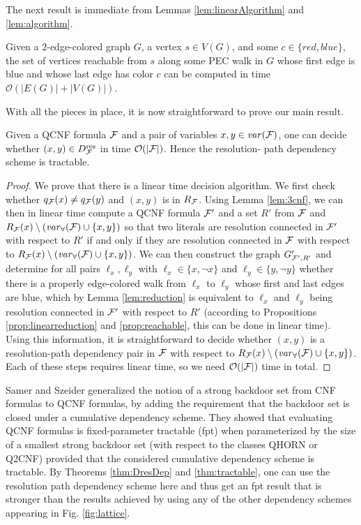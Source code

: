 \documentclass{llncs}
\newcommand{\Dres}{D^{\text{\normalfont res}}}
\def\hy{\hbox{-}\nobreak\hskip0pt} \newcommand{\ellipsis}{$\dots$}
\newcommand{\Card}[1]{|#1|}
\begin{document}
The next result is immediate from Lemmas \ref{lem:linearAlgorithm} and
\ref{lem:algorithm}.
\begin{proposition}\label{prop:reachable}
  Given a $2$\hy edge\hy colored graph $G$, a vertex $s \in V(G)$, and some $c
  \in \{ \mathit{red}, \mathit{blue} \}$, the set of vertices reachable from
  $s$ along some PEC walk in $G$ whose first edge is blue and whose last edge
  has color $c$ can be computed in time
  $\mathcal{O}(\Card{E(G)}+\Card{V(G)})$.
\end{proposition}
With all the pieces in place, it is now straightforward to prove our main result.
\begin{theorem} \label{thm:tractable} Given a QCNF formula $\mathcal{F}$ and a pair
  of variables $x, y \in \mathit{var}(\mathcal{F})$, one can decide whether $(x,y) \in
  \Dres_{\FFF}$ in time $\mathcal{O}(\Card{\FFF})$. Hence the resolution\hy
  path dependency scheme is tractable.
\end{theorem}
\begin{proof}
  We prove that there is a linear time decision algorithm. We first check
  whether $q_{\mathcal{F}}(x) \neq q_{\mathcal{F}}(y)$ and $(x,y)$ is in $R_{\mathcal{F}}$. Using
  Lemma \ref{lem:3cnf}, we can then in linear time compute a QCNF formula
  $\mathcal{F}'$ and a set $R'$ from $\mathcal{F}$ and $R_{\mathcal{F}}(x) \setminus
  (\mathit{var}_{\forall}(\mathcal{F}) \cup \{x,y\})$ so that two literals are resolution
  connected in $\mathcal{F}'$ with respect to $R'$ if and only if they are resolution
  connected in $\mathcal{F}$ with respect to $R_{\mathcal{F}}(x) \setminus
  (\mathit{var}_{\forall}(\mathcal{F}) \cup \{x,y\})$. We can then construct the graph
  $G'_{\mathcal{F}',R'}$ and determine for all pairs $\ell_x,\ell_y$ with $\ell_x \in
  \{x, \neg x\}$ and $\ell_y \in \{y, \neg y\}$ whether there is a properly
  edge\hy colored walk from $\ell_x$ to $\ell_y$ whose first and last edges
  are blue, which by Lemma \ref{lem:reduction} is equivalent to $\ell_x$ and
  $\ell_y$ being resolution connected in $\mathcal{F}'$ with respect to $R'$
  (according to Propositions \ref{prop:linearreduction} and
  \ref{prop:reachable}, this can be done in linear time). Using this
  information, it is straightforward to decide whether $(x,y)$ is a
  resolution\hy path dependency pair in $\mathcal{F}$ with respect to $R_{\mathcal{F}}(x)
  \setminus (\mathit{var}_{\forall}(\mathcal{F}) \cup \{x,y\})$. Each of these steps requires
  linear time, so we need $\mathcal{O}(\Card{\FFF})$ time in total.
\end{proof}

Samer and Szeider \cite{SamerSzeider09a} generalized the notion of a strong
backdoor set from CNF formulas to QCNF formulas, by adding the requirement
that the backdoor set is closed under a cumulative dependency scheme. They
showed that evaluating QCNF formulas is fixed-parameter tractable (fpt) when
parameterized by the size of a smallest strong backdoor set (with respect to
the classes QHORN or Q2CNF) provided that the considered cumulative dependency
scheme is tractable. By Theorems \ref{thm:DresDep} and \ref{thm:tractable},
one can use the resolution path dependency scheme here and thus get an fpt
result that is stronger than the results achieved by using any of the other
dependency schemes appearing in Fig. \ref{fig:lattice}.
\end{document}
